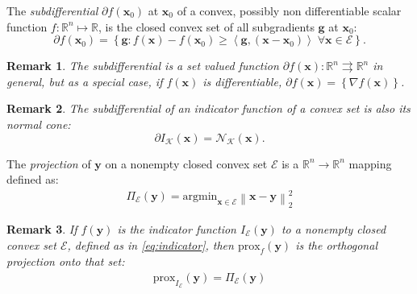 \documentclass[AMA,STIX1COL]{WileyNJD-v2}
\newcommand{\vect}[1]{\bm{#1}}
\newcommand{\norm}[1]{\left\lVert#1\right\rVert}
\newtheorem*{remark*}{Remark}
\begin{document}
\begin{definition}
The \textit{subdifferential} $\partial f(\vect{x}_0)$ at $\vect{x}_0$ of a convex, possibly non differentiable scalar function $f: \mathbb{R}^n \mapsto \mathbb{R}$, is the closed convex set of all subgradients $\vect{g}$ at $\vect{x}_0$:
\begin{equation}
\label{eq:subdifferential}
\partial f(\vect{x}_0) = \left\{ \vect{g} : 
  f(\vect{x}) -  f(\vect{x}_0) \geq \left\langle \vect{g}, (\vect{x} - \vect{x}_0) \right\rangle \; \forall \vect{x} \in \mathcal{E} \right\}.
\end{equation}
\end{definition}


\begin{remark*}
The subdifferential is a set valued function $\partial f(\vect{x}): \mathbb{R}^n \rightrightarrows \mathbb{R}^n$ in general, but as a special case, if $f(\vect{x})$ is differentiable, $\partial f(\vect{x}) = \left\{ \nabla f(\vect{x}) \right\}$.
\end{remark*}

\begin{remark*}
The subdifferential of an indicator function of a convex set is also its normal cone:
%
\begin{equation}
\label{eq:sub_ind}
\partial {I}_{\mathcal{K}}(\vect{x}) = \mathcal{N}_{\mathcal{K}}(\vect{x}).
\end{equation}
\end{remark*}

\begin{definition}
The \textit{projection} of $\vect{y}$ on a nonempty closed convex set $\mathcal{E}$ is a $\mathbb{R}^n \rightarrow \mathbb{R}^n$ mapping defined as:
%
\begin{align}
\label{eq:projector}
\Pi_{\mathcal{E}}(\vect{y}) = \mathrm{argmin}_{\vect{x} \in \mathcal{E}} \norm{ \vect{x} - \vect{y} }^2_2
\end{align}
\end{definition}

\begin{remark*}
If $f(\vect{y})$ is the indicator function $I_{\mathcal{E}}(\vect{y})$ to a nonempty closed convex set ${\mathcal{E}}$, defined as in \eqref{eq:indicator}, then $\mathrm{prox}_{f}(\vect{y})$ is the orthogonal projection onto that set:
%
\begin{align}
\label{eq:projectorindicator}
\mathrm{prox}_{I_{\mathcal{E}}}(\vect{y})  = \Pi_{\mathcal{E}}(\vect{y}) 
\end{align}
\label{def:projection}
\end{remark*}
\end{document}
